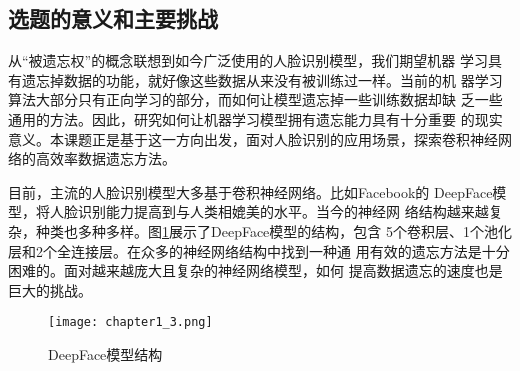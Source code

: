 

\subsection{选题的意义和主要挑战}
从“被遗忘权”的概念联想到如今广泛使用的人脸识别模型，我们期望机器
学习具有遗忘掉数据的功能，就好像这些数据从来没有被训练过一样。当前的机
器学习算法大部分只有正向学习的部分，而如何让模型遗忘掉一些训练数据却缺
乏一些通用的方法。因此，研究如何让机器学习模型拥有遗忘能力具有十分重要
的现实意义。本课题正是基于这一方向出发，面对人脸识别的应用场景，探索卷积神经网络的高效率数据遗忘方法。

目前，主流的人脸识别模型大多基于卷积神经网络\cite{GUO2019102805}。比如Facebook的
DeepFace模型\cite{deepface2014}，将人脸识别能力提高到与人类相媲美的水平。当今的神经网
络结构越来越复杂，种类也多种多样。图\ref{fig:chapter1_3}展示了DeepFace模型的结构，包含
5个卷积层、1个池化层和2个全连接层。在众多的神经网络结构中找到一种通
用有效的遗忘方法是十分困难的。面对越来越庞大且复杂的神经网络模型，如何
提高数据遗忘的速度也是巨大的挑战。
\begin{figure}
  \centering
  \texttt{[image: chapter1\_3.png]}
  \caption{DeepFace模型结构\cite{deepface2014}}
  \label{fig:chapter1_3}
\end{figure}

